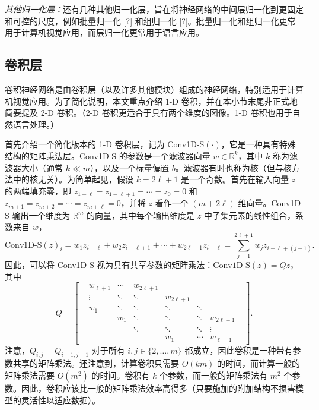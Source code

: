 \vspace{0.5em}
\noindent\textit{其他归一化层：}还有几种其他归一化层，旨在将神经网络的中间层归一化到更固定和可控的尺度，例如批量归一化 [?] 和组归一化 [?]。批量归一化和组归一化更常用于计算机视觉应用，而层归一化更常用于语言应用。

\subsection*{卷积层}

卷积神经网络是由卷积层（以及许多其他模块）组成的神经网络，特别适用于计算机视觉应用。为了简化说明，本文重点介绍 1-D 卷积，并在本小节末尾非正式地简要提及 2-D 卷积。（2-D 卷积更适合于具有两个维度的图像。1-D 卷积也用于自然语言处理。）

首先介绍一个简化版本的 1-D 卷积层，记为 Conv1D-S$(\cdot)$，它是一种具有特殊结构的矩阵乘法层。Conv1D-S 的参数是一个滤波器向量 $w \in \mathbb{R}^k$，其中 $k$ 称为滤波器大小（通常 $k \ll m$），以及一个标量偏置 $b$。滤波器有时也称为核（但与核方法中的核无关）。为简单起见，假设 $k = 2\ell + 1$ 是一个奇数。首先在输入向量 $z$ 的两端填充零，即 $z_{1-\ell} = z_{1-\ell+1} = \cdots = z_0 = 0$ 和 $z_{m+1} = z_{m+2} = \cdots = z_{m+\ell} = 0$，并将 $z$ 看作一个 $(m+2\ell)$ 维向量。Conv1D-S 输出一个维度为 $\mathbb{R}^m$ 的向量，其中每个输出维度是 $z$ 中子集元素的线性组合，系数来自 $w$，
\begin{equation}
    \text{Conv1D-S}(z)_i = w_1 z_{i-\ell} + w_2 z_{i-\ell+1} + \cdots + w_{2\ell+1} z_{i+\ell} = \sum_{j=1}^{2\ell+1} w_j z_{i-\ell+(j-1)}. \label{eq:7.48}
\end{equation}
因此，可以将 Conv1D-S 视为具有共享参数的矩阵乘法：$\text{Conv1D-S}(z) = Qz$，其中
\begin{equation}
    Q = \begin{bmatrix}
        &w_{\ell+1} &\cdots &w_{2\ell+1} & &\\
        &\vdots     &\ddots &\ddots      &w_{2\ell+1} & &\\
        &w_1        &\ddots &\ddots      &\ddots &\ddots & &\\
        &           &w_1    &\ddots      &\ddots &\ddots &w_{2\ell+1} &\\
        &           &       &\ddots      &\ddots &\ddots &\vdots &\\
        &           &       &            &w_1    &\cdots &w_{\ell+1} &
        
    \end{bmatrix}. \label{eq:7.49}
\end{equation}
注意，$Q_{i,j} = Q_{i-1,j-1}$ 对于所有 $i, j \in \{2, \ldots, m\}$ 都成立，因此卷积是一种带有参数共享的矩阵乘法。还注意到，计算卷积只需要 $O(km)$ 的时间，而计算一般的矩阵乘法需要 $O(m^2)$ 的时间。卷积有 $k$ 个参数，而一般的矩阵乘法有 $m^2$ 个参数。因此，卷积应该比一般的矩阵乘法效率高得多（只要施加的附加结构不损害模型的灵活性以适应数据）。

